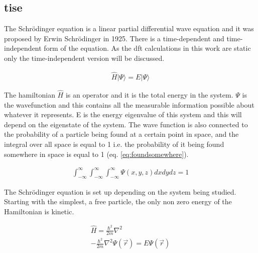 \FloatBarrier
\subsection{\acrlong{tise}}

The Schr\"{o}dinger equation is a linear partial differential wave equation and it was proposed by Erwin Schr\"{o}dinger in 1925.  There is a time-dependent and time-independent form of the equation.  As the \acrshort{dft} calculations in this work are static only the time-independent version will be discussed.  

\begin{equation}
\begin{split}
\hat{H} \lvert \Psi \rangle = E \lvert \Psi \rangle
\end{split}
\label{eq:eqTimeIndependentSchrodinger}
\end{equation}

The \Gls{hamiltonian} $\hat{H}$ is an operator and it is the total energy in the system.  $\Psi$ is the \gls{wavefunction} and this contains all the measurable information possible about whatever it represents.  E is the energy eigenvalue of this system and this will depend on the eigenstate of the system.  The wave function is also connected to the probability of a particle being found at a certain point in space, and the integral over all space is equal to 1 i.e. the probability of it being found somewhere in space is equal to 1 (eq. \ref{eq:foundsomewhere}).

\begin{equation}
\begin{split}
\int_{-\infty}^{\infty} \int_{-\infty}^{\infty}  \int_{-\infty}^{\infty}  \Psi(x,y,z) dx dy dz = 1
\end{split}
\label{eq:foundsomewhere}
\end{equation}

The Schr\"{o}dinger equation is set up depending on the system being studied.  Starting with the simplest, a free particle, the only non zero energy of the Hamiltonian is kinetic.


\begin{equation}
\begin{split}
\hat{H} = \frac{\hbar^2}{2 m} \nabla^2 \\
-\frac{\hbar^2}{2 m} \nabla^2 \Psi(\vec{r}) = E \Psi(\vec{r})
\end{split}
\label{eq:eqTimeIndependentSchrodinger1}
\end{equation}

